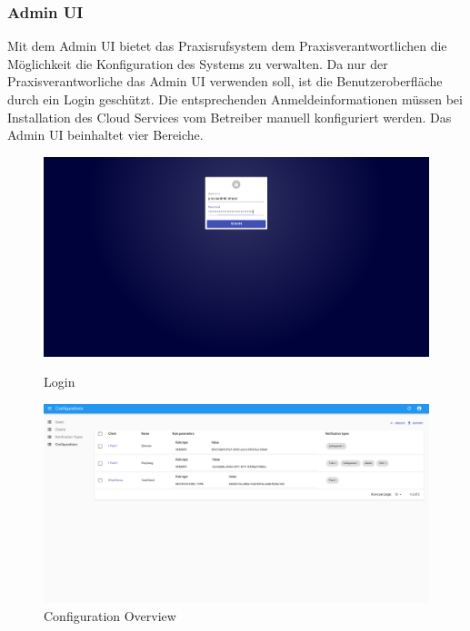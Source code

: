 \subsubsection{Admin UI}

Mit dem Admin UI bietet das Praxisrufsystem dem Praxisverantwortlichen die Möglichkeit die Konfiguration des Systems zu verwalten.
Da nur der Praxisverantworliche das Admin UI verwenden soll, ist die Benutzeroberfläche durch ein Login geschützt.
Die entsprechenden Anmeldeinformationen müssen bei Installation des Cloud Services vom Betreiber manuell konfiguriert werden.
Das Admin UI beinhaltet vier Bereiche.

\begin{figure}[h]
    \centering
    \begin{minipage}[b]{0.4\textwidth}
        \includegraphics[width=\textwidth]{graphics/screenshots/adminui/login}
        \caption{Login}
    \end{minipage}
    \hfill
    \begin{minipage}[b]{0.4\textwidth}
        \includegraphics[width=\textwidth]{graphics/screenshots/adminui/configuration-all}
        \caption{Configuration Overview}
    \end{minipage}
    \label{fig:AdminUI-Screens1}
\end{figure}

